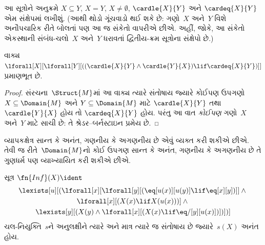 આ સૂત્રોને અનુક્રમે $X \subseteq Y$, $X = Y$, $X \neq
\emptyset$, $\cardle{X}{Y}$ અને $\cardeq{X}{Y}$ એમ સંક્ષેપમાં
લખીશું. (આથી થોડો ગૂંચવાડો થઈ શકે છે: ગણો~$X$ અને~$Y$ વિશે
અનૌપચારિક રીતે બોલતાં પણ આ જ સંકેતો વાપરીએ છીએ. અહીં, જોકે, આ
સંકેતો એકસ્થાની સંબંધ-ચલો~$X$ અને~$Y$ ધરાવતાં દ્વિતીય-ક્રમ
સૂત્રોના સંક્ષેપો છે.)

\begin{prop}
વાક્ય~$\lforall[X][\lforall[Y][((\cardle{X}{Y} \land
    \cardle{Y}{X}) \lif \cardeq{X}{Y})]]$ પ્રમાણભૂત છે.
\end{prop}

\begin{proof}
સંરચના~$\Struct{M}$માં આ વાક્ય ત્યારે સંતોષાય જ્યારે
કોઈપણ ઉપગણો $X \subseteq \Domain{M}$ અને $Y \subseteq
\Domain{M}$ માટે $\cardle{X}{Y}$ તથા $\cardle{Y}{X}$ હોય તો
$\cardeq{X}{Y}$ હોય. પરંતુ આ વાત \emph{કોઈપણ} ગણો~$X$ અને~$Y$
માટે સાચી છે: તે શ્રેડર--બર્નસ્ટાઇન પ્રમેય છે.
\end{proof}
\endgroup


\begingroup
\makeatletter{}\makeatother


\label{guunit:OLP-0339}


\begin{explain}
વ્યાપકક્ષેત્ર સાન્ત કે અનંત, ગણનીય કે અગણનીય
છે એવું વ્યક્ત કરી શકીએ છીએ. તેવી જ રીતે~$\Domain{M}$નો કોઈ ઉપગણ
સાન્ત કે અનંત, ગણનીય કે અગણનીય છે તે ગુણધર્મ
પણ વ્યાખ્યાયિત કરી શકીએ છીએ.
\end{explain}

\begin{prop}
સૂત્ર $\fn{Inf}(X) \ident$
\begin{multline*}
\lexists[u][(\lforall[x][\lforall[y][(\eq[u(x)][u(y)] \lif
      \eq[x][y])]] \land {} \\
\lforall[x][(X(x) \lif X(u(x)))] \land {} \\
\lexists[y][(X(y) \land \lforall[x][(X(x)
      \lif \eq/[y][u(x)])])])]
\end{multline*}
ચલ-નિયુક્તિ~$s$ને અનુલક્ષીને ત્યારે અને માત્ર ત્યારે જ સંતોષાય છે
જ્યારે~$s(X)$ અનંત હોય.
\end{prop}


